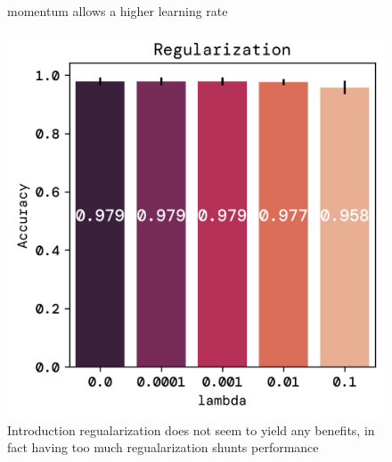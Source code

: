 \documentclass[twoside,11pt]{report}
\begin{document}
\begin{figure}[!ht]
\begin{minipage}[t]{0.5\textwidth - 1mm}
{                momentum allows a higher learning rate
            }\label{fig:accuracy_lr_gamma}
        \end{minipage}
        \hspace{2mm}
        \begin{minipage}[t]{0.5\textwidth - 1mm}
            \begin{center}
                \includegraphics[width=\textwidth]{../runsAndFigures/accuracy_alpha.png}
            \end{center}
            \caption{Introduction regualarization does not seem to yield any benefits, in fact
            having too much regualarization shunts performance}\label{fig:accuracy_aplha}
        \end{minipage}
    \end{figure}
\end{document}
